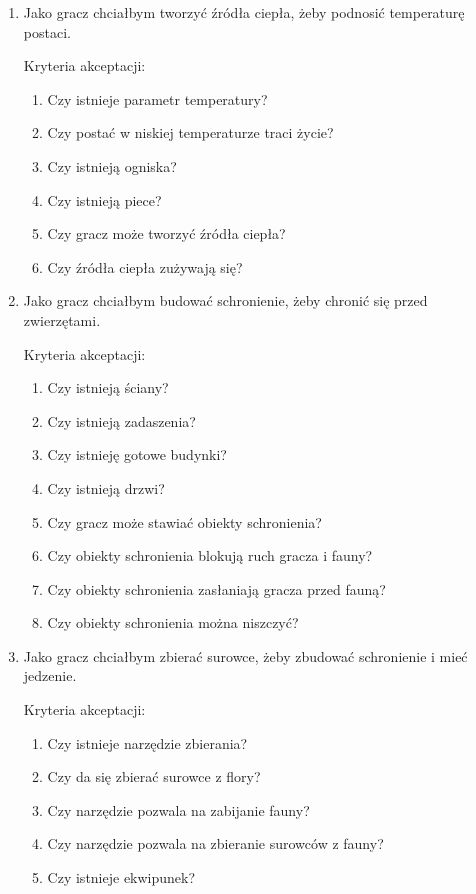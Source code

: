 \begin{enumerate}
    \item Jako gracz chciałbym tworzyć źródła ciepła, żeby podnosić temperaturę postaci.
    
        Kryteria akceptacji:
        \begin{enumerate}
            \item Czy istnieje parametr temperatury?
            \item Czy postać w niskiej temperaturze traci życie?
            \item Czy istnieją ogniska?
            \item Czy istnieją piece?
            \item Czy gracz może tworzyć źródła ciepła?
            \item Czy źródła ciepła zużywają się?
        \end{enumerate}
        
    \item Jako gracz chciałbym budować schronienie, żeby chronić się przed zwierzętami.

    Kryteria akceptacji:
    \begin{enumerate}
        \item Czy istnieją ściany?
        \item Czy istnieją zadaszenia?
        \item Czy istnieję gotowe budynki?
        \item Czy istnieją drzwi?
        \item Czy gracz może stawiać obiekty schronienia?
        \item Czy obiekty schronienia blokują ruch gracza i fauny?
        \item Czy obiekty schronienia zasłaniają gracza przed fauną?
        \item Czy obiekty schronienia można niszczyć?
    \end{enumerate}
    
    \item Jako gracz chciałbym zbierać surowce, żeby zbudować schronienie i mieć jedzenie.
    
    Kryteria akceptacji:
    \begin{enumerate}
        \item Czy istnieje narzędzie zbierania?
        \item Czy da się zbierać surowce z flory?
        \item Czy narzędzie pozwala na zabijanie fauny? 
        \item Czy narzędzie pozwala na zbieranie surowców z fauny?
        \item Czy istnieje ekwipunek?
    \end{enumerate}
\end{enumerate}